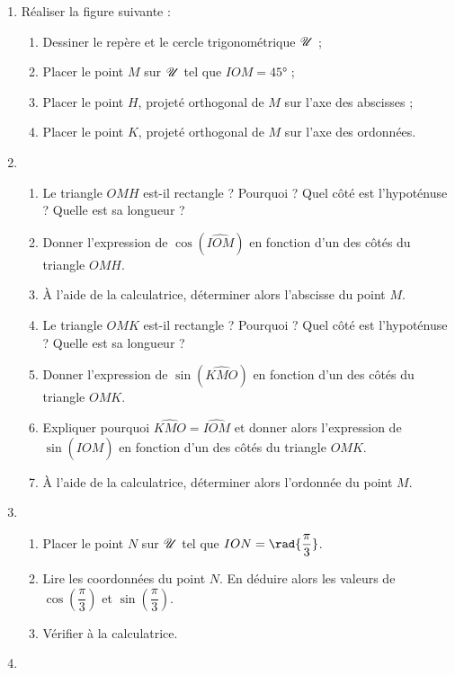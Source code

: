 \documentclass[10pt,openright,twoside,french]{book}
\begin{document}
\begin{enumerate}
    \item Réaliser la figure suivante :
    \begin{enumerate}
        \item Dessiner le repère et le cercle trigonométrique $\mathscr{U}$ ;
        \item Placer le point $M$ sur $\mathscr{U}$ tel que $IOM = \ang{45}$ ;
        \item Placer le point $H$, projeté orthogonal de $M$ sur l'axe des abscisses ;
        \item Placer le point $K$, projeté orthogonal de $M$ sur l'axe des ordonnées.
    \end{enumerate}
    \item
    \begin{enumerate}
        \item Le triangle $OMH$ est-il rectangle ? Pourquoi ? Quel côté est l'hypoténuse ? Quelle est sa longueur ?
        \item Donner l'expression de $\cos\left(\widehat{IOM}\right)$ en fonction d'un des côtés du triangle $OMH$.
        \item À l'aide de la calculatrice, déterminer alors l'abscisse du point $M$.
        \item Le triangle $OMK$ est-il rectangle ? Pourquoi ? Quel côté est l'hypoténuse ? Quelle est sa longueur ?
        \item Donner l'expression de $\sin\left(\widehat{KMO}\right)$ en fonction d'un des côtés du triangle $OMK$.
        \item Expliquer pourquoi $\widehat{KMO} = \widehat{IOM}$ et donner alors l'expression de $\sin\left(\widehat{IOM}\right)$ en fonction d'un des côtés du triangle $OMK$.
        \item À l'aide de la calculatrice, déterminer alors l'ordonnée du point $M$.
    \end{enumerate}
    \item
    \begin{enumerate}
        \item Placer le point $N$ sur $\mathscr{U}$ tel que $ION =  \rad{\dfrac\pi3}$.
        \item Lire les coordonnées du point $N$. En déduire alors les valeurs de $\cos\left(\dfrac\pi3\right)$ et $\sin\left(\dfrac\pi3\right)$.
        \item Vérifier à la calculatrice.
    \end{enumerate}
    \item

\end{enumerate}
\end{document}
